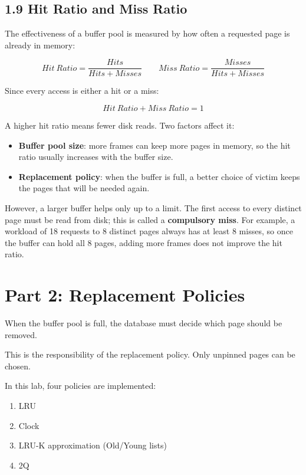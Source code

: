 \documentclass[12pt,a4paper]{article}
\begin{document}
\subsection{1.9 Hit Ratio and Miss Ratio}

The effectiveness of a buffer pool is measured by how often a requested page is already in memory:

\[
Hit\ Ratio =
\frac{Hits}{Hits+Misses}
\qquad
Miss\ Ratio =
\frac{Misses}{Hits+Misses}
\]

Since every access is either a hit or a miss:

\[
Hit\ Ratio + Miss\ Ratio = 1
\]

A higher hit ratio means fewer disk reads. Two factors affect it:

\begin{itemize}
    \item \textbf{Buffer pool size}: more frames can keep more pages in memory, so the hit ratio usually increases with the buffer size.
    \item \textbf{Replacement policy}: when the buffer is full, a better choice of victim keeps the pages that will be needed again.
\end{itemize}

However, a larger buffer helps only up to a limit. The first access to every distinct page must be read from disk; this is called a \textbf{compulsory miss}. For example, a workload of 18 requests to 8 distinct pages always has at least 8 misses, so once the buffer can hold all 8 pages, adding more frames does not improve the hit ratio.

\section{Part 2: Replacement Policies}

When the buffer pool is full, the database must decide which page should be removed.

This is the responsibility of the replacement policy. Only unpinned pages can be chosen.

In this lab, four policies are implemented:

\begin{enumerate}
    \item LRU
    \item Clock
    \item LRU-K approximation (Old/Young lists)
    \item 2Q
\end{enumerate}
\end{document}
